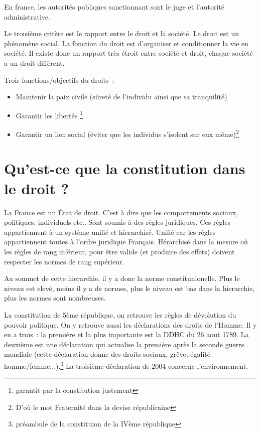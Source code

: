 En france, les autorités publiques sanctionnant sont le juge et l'autorité administrative. \newline

Le troisième critère est le rapport entre le droit et la société. Le droit est un phénomène social. La fonction du droit est d'organiser et conditionner la vie en société. Il existe donc un rapport très étroit entre société et droit, chaque société a un droit différent. \newline

Trois fonctions/objectifs du droits~:
\begin{itemize}
\item Maintenir la paix civile (sûreté de l'individu ainsi que sa tranquilité)
\item Garantir les libertés \footnote{garantit par la constitution justement}
\item Garantir un lien social (éviter que les individus s'isolent sur eux même)\footnote{D'où le mot Fraternité dans la devise républicaine}
\end{itemize}


\section{Qu'est-ce que la constitution dans le droit ?}

La France est un État de droit. C'est à dire que les comportements sociaux, politiques, individuels etc.. Sont soumis à des règles juridiques. Ces règles appartiennent à un système unifié et hierarchisé. Unifié car les règles appartiennent toutes à l'ordre juridique Français. Hérarchisé dans la mesure où les règles de rang inférieur, pour être valide (et produire des effets) doivent respecter les normes de rang supérieur.\newline

Au sommet de cette hierarchie, il y a donc la norme constitunionelle. Plus le niveau est elevé, moins il y a de normes, plus le niveau est bas dans la hierarchie, plus les normes sont nombreuses.\newline

La constitution de 5ème république, on retrouve les règles de dévolution du pouvoir politique. On y retrouve aussi les déclarations des droits de l'Homme. Il y en a trois~: la première et la plus importante est la DDHC du 26 aout 1789. La deuxième est une déclaration qui actualise la première après la seconde guerre mondiale (cette déclaration donne des droits sociaux, grêve, égalité homme/femme...).\footnote{préambule de la constituion de la IVème république} La troisième déclaration de 2004 concerne l'environnement.

